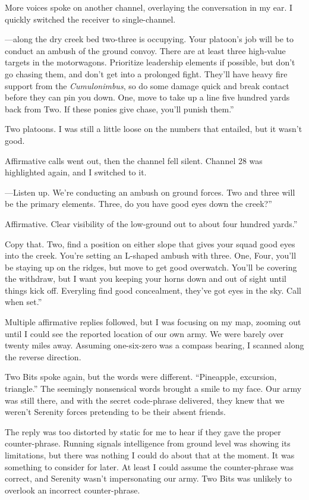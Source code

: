 More voices spoke on another channel, overlaying the conversation in my ear. I quickly switched the receiver to single-channel.

\leavevmode{}—along the dry creek bed two-three is occupying. Your platoon’s job will be to conduct an ambush of the ground convoy. There are at least three high-value targets in the motorwagons. Prioritize leadership elements if possible, but don’t go chasing them, and don’t get into a prolonged fight. They’ll have heavy fire support from the \textit{Cumulonimbus}, so do some damage quick and break contact before they can pin you down. One, move to take up a line five hundred yards back from Two. If these ponies give chase, you’ll punish them.”

Two platoons. I was still a little loose on the numbers that entailed, but it wasn’t good.

Affirmative calls went out, then the channel fell silent. Channel 28 was highlighted again, and I switched to it.

\leavevmode{}—Listen up. We’re conducting an ambush on ground forces. Two and three will be the primary elements. Three, do you have good eyes down the creek?”

\leavevmode{}Affirmative. Clear visibility of the low-ground out to about four hundred yards.”

\leavevmode{}Copy that. Two, find a position on either slope that gives your squad good eyes into the creek. You’re setting an L-shaped ambush with three. One, Four, you’ll be staying up on the ridges, but move to get good overwatch. You’ll be covering the withdraw, but I want you keeping your horns down and out of sight until things kick off. Everyling find good concealment, they’ve got eyes in the sky. Call when set.”

Multiple affirmative replies followed, but I was focusing on my map, zooming out until I could see the reported location of our own army. We were barely over twenty miles away. Assuming one-six-zero was a compass bearing, I scanned along the reverse direction.

Two Bits spoke again, but the words were different. “Pineapple, excursion, triangle.” The seemingly nonsensical words brought a smile to my face. Our army was still there, and with the secret code-phrase delivered, they knew that we weren’t Serenity forces pretending to be their absent friends.

The reply was too distorted by static for me to hear if they gave the proper counter-phrase. Running signals intelligence from ground level was showing its limitations, but there was nothing I could do about that at the moment. It was something to consider for later. At least I could assume the counter-phrase was correct, and Serenity wasn’t impersonating our army. Two Bits was unlikely to overlook an incorrect counter-phrase.

